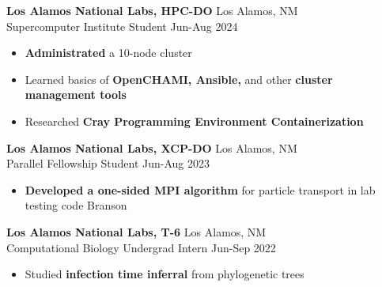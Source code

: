 \documentclass[12pt]{article}
\newcommand{\entry}[4]{{{\textbf{#1}}} \hfill #3 \\ #2 \hfill #4}
\begin{document}
\begin{minipage}[t]{0.63\textwidth}
  \entry{Los Alamos National Labs, HPC-DO}{Supercomputer Institute Student}{Los Alamos, NM}{Jun-Aug 2024}
  \begin{itemize}[noitemsep,rightmargin=0mm,topsep=0pt,leftmargin=.75cm]
    \item \textbf{Administrated} a 10-node cluster
    \item Learned basics of \textbf{OpenCHAMI, Ansible,} and other \textbf{cluster management tools}
    \item Researched \textbf{Cray Programming Environment Containerization}
  \end{itemize}

  \medskip

  \entry{Los Alamos National Labs, XCP-DO}{Parallel Fellowship Student}{Los Alamos, NM}{Jun-Aug 2023}
  \begin{itemize}[noitemsep,rightmargin=0mm,topsep=0pt,leftmargin=.75cm]
    \item {\bf Developed a one-sided MPI algorithm} for particle transport in lab testing code Branson
  \end{itemize}

  \medskip

  \entry{Los Alamos National Labs, T-6}{Computational Biology Undergrad Intern}{Los Alamos, NM}{Jun-Sep 2022}
  \begin{itemize}[noitemsep,rightmargin=0mm,topsep=0pt,leftmargin=.75cm]
    \item Studied {\bf infection time inferral} from phylogenetic trees
  \end{itemize}
\end{minipage}%
\hspace{0.04\textwidth}%
\end{document}
